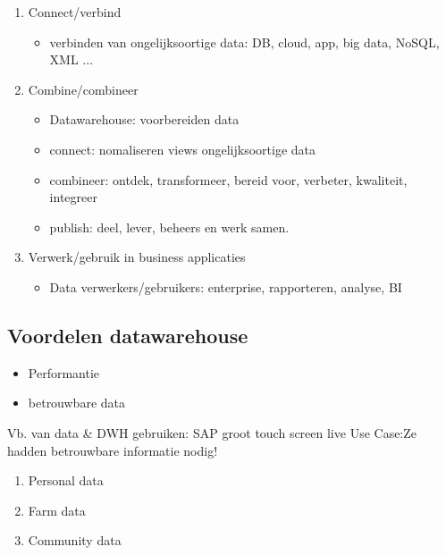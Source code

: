 \documentclass{report}
\begin{document}
    \begin{enumerate}
        \item Connect/verbind
        \begin{itemize}
            \item verbinden van ongelijksoortige data: DB, cloud, app, big data, NoSQL, XML ...
        \end{itemize}
        \item Combine/combineer
        \begin{itemize}
            \item Datawarehouse: voorbereiden data
            \item connect: nomaliseren views ongelijksoortige data
            \item combineer: ontdek, transformeer, bereid voor, verbeter, kwaliteit, integreer
            \item publish: deel, lever, beheers en werk samen.
        \end{itemize}
        \item Verwerk/gebruik in business applicaties
        \begin{itemize}
            \item Data verwerkers/gebruikers: enterprise, rapporteren, analyse, BI
        \end{itemize}
    \end{enumerate}
    \subsection{Voordelen datawarehouse}
    \begin{itemize}
        \item Performantie
        \item betrouwbare data
    \end{itemize}
    Vb. van data \& DWH gebruiken: SAP groot touch screen live
    Use Case:Ze hadden betrouwbare informatie nodig!
    \begin{enumerate}
        \item Personal data
        \item Farm data
        \item Community data
    \end{enumerate}
\end{document}

